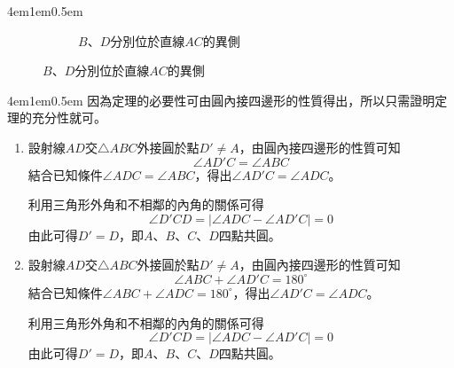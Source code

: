 \documentclass[12pt]{article}
\begin{document}
\begin{mybox}[定理]{4em}{1em}{0.5em}
\begin{figure}[H]
\begin{subfigure}[b]{0.45\textwidth}
            \centering
            \caption{$B$、$D$分別位於直線$AC$的異側}
            \label{fig:Angle_s2.2-2}
        \end{subfigure}
    \end{figure}
\end{mybox}
\begin{mybox}[證明]{4em}{1em}{0.5em}
    因為定理的必要性可由圓內接四邊形的性質得出，所以只需證明定理的充分性就可。
    \begin{enumerate}[label= (\roman*.), itemsep=0.3em]
        \item 設射線$AD$交$\triangle{ABC}$外接圓於點$D'\neq A$，由圓內接四邊形的性質可知
        $$
            \angle{AD'C}=\angle{ABC}
        $$
        結合已知條件$\angle{ADC}=\angle{ABC}$，得出$\angle{AD'C}=\angle{ADC}$。

        利用三角形外角和不相鄰的內角的關係可得
        $$
            \angle{D'CD}=\left|\angle{ADC}-\angle{AD'C}\right|=0
        $$
        由此可得$D'=D$，即$A$、$B$、$C$、$D$四點共圓。
        \item 設射線$AD$交$\triangle{ABC}$外接圓於點$D'\neq A$，由圓內接四邊形的性質可知
        $$
            \angle{ABC}+\angle{AD'C}=180^{\circ}
        $$
        結合已知條件$\angle{ABC}+\angle{ADC}=180^{\circ}$，得出$\angle{AD'C}=\angle{ADC}$。

        利用三角形外角和不相鄰的內角的關係可得
        $$
            \angle{D'CD}=\left|\angle{ADC}-\angle{AD'C}\right|=0
        $$
        由此可得$D'=D$，即$A$、$B$、$C$、$D$四點共圓。
    \end{enumerate}
\end{mybox}
\end{document}
